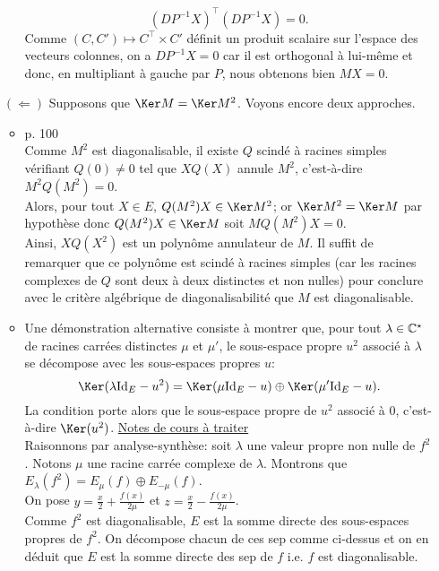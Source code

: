 \begin{demo}
\begin{itemize}
\begin{itemize}
            $$(D P^{-1} X)^\top (D P^{-1} X) = 0.$$
            Comme $(C, C') \mapsto C^\top \times C'$ définit un produit scalaire sur l'espace des vecteurs colonnes, on a $D P^{-1} X = 0$ car il est orthogonal à lui-même et donc, en multipliant à gauche par $P$, nous obtenons bien $MX = 0$. 
        \end{itemize}
        \item[$(\Leftarrow)$] Supposons que $\Ker M = \Ker M^2$. Voyons encore deux approches.
        \begin{itemize}
            \item \cite{reduc_des_endo} p. 100 \note 
            \\
            Comme $M^2$ est diagonalisable, il existe $Q$ scindé à racines simples vérifiant $Q(0) \not= 0$ tel que $X Q(X)$ annule $M^2$, c'est-à-dire $M^2 Q(M^2) = 0$. \\
            Alors, pour tout $X \in E$, $Q(M^2)X \in \Ker M^2$; or $\Ker M^2 = \Ker M$ par hypothèse donc $Q(M^2)X \in \Ker M$ soit $M Q(M^2)X = 0$. \\
            Ainsi, $XQ(X^2)$ est un polynôme annulateur de $M$. Il suffit de remarquer que ce polynôme est scindé à racines simples (car les racines complexes de $Q$ sont deux à deux distinctes et non nulles) pour conclure avec le critère algébrique de diagonalisabilité que $M$ est diagonalisable.
            \item 
            Une démonstration alternative consiste à montrer que, pour tout $\lambda \in \mathbb{C}^\star$ de racines carrées distinctes $\mu$ et $\mu'$, le sous-espace propre $u^2$ associé à $\lambda$ se décompose avec les sous-espaces propres $u$:
            $$\Ker(\lambda \Id_E - u^2) = \Ker(\mu \Id_E - u) \oplus \Ker(\mu' \Id_E - u).$$
            La condition porte alors que le sous-espace propre de $u^2$ associé à $0$, c'est-à-dire $\Ker(u^2)$.
            \underline{Notes de cours à traiter} \\
            Raisonnons par analyse-synthèse: soit $\lambda$ une valeur propre non nulle de $f^2$. Notons $\mu$ une racine carrée complexe de $\lambda$. Montrons que $E_{\lambda}(f^2) = E_{\mu}(f) \oplus E_{-\mu}(f)$. \\
            On pose $y = \frac{x}{2} + \frac{f(x)}{2 \mu}$ et $z = \frac{x}{2} - \frac{f(x)}{2 \mu}$. \\
            Comme $f^2$ est diagonalisable, $E$ est la somme directe des sous-espaces propres de $f^2$. On décompose chacun de ces sep comme ci-dessus et on en déduit que $E$ est la somme directe des sep de $f$ i.e. $f$ est diagonalisable. \\

        \end{itemize}
    \end{itemize}
\end{demo}
